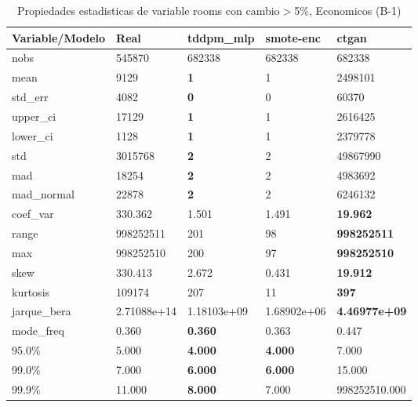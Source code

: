 \begin{table}[H]
\centering
\fontsize{8}{14}\selectfont
\caption{Propiedades estadisticas de variable rooms con cambio\ensuremath{>}5\%, Economicos (B-1)}
\label{table-stats-economicos-b-1-rooms-short}
\begin{tabular}{|l|m{10em}|m{10em}|m{10em}|m{10em}|}
\hline
 \rowcolor[gray]{0.8}
Variable/Modelo & Real & tddpm\_mlp & smote-enc & ctgan \\
\hline nobs & 545870 & 682338 & 682338 & 682338 \\
\hline mean & 9129 & \bfseries 1 & 1 & \cellcolor[rgb]{0.9, 0.54, 0.52} 2498101 \\
\hline std\_err & 4082 & \bfseries 0 & 0 & \cellcolor[rgb]{0.9, 0.54, 0.52} 60370 \\
\hline upper\_ci & 17129 & \bfseries 1 & 1 & \cellcolor[rgb]{0.9, 0.54, 0.52} 2616425 \\
\hline lower\_ci & 1128 & \bfseries 1 & 1 & \cellcolor[rgb]{0.9, 0.54, 0.52} 2379778 \\
\hline std & 3015768 & \bfseries 2 & 2 & \cellcolor[rgb]{0.9, 0.54, 0.52} 49867990 \\
\hline mad & 18254 & \bfseries 2 & 2 & \cellcolor[rgb]{0.9, 0.54, 0.52} 4983692 \\
\hline mad\_normal & 22878 & \bfseries 2 & 2 & \cellcolor[rgb]{0.9, 0.54, 0.52} 6246132 \\
\hline coef\_var & 330.362 & 1.501 & \cellcolor[rgb]{0.9, 0.54, 0.52} 1.491 & \bfseries 19.962 \\
\hline range & 998252511 & 201 & \cellcolor[rgb]{0.9, 0.54, 0.52} 98 & \bfseries 998252511 \\
\hline max & 998252510 & 200 & \cellcolor[rgb]{0.9, 0.54, 0.52} 97 & \bfseries 998252510 \\
\hline skew & 330.413 & 2.672 & \cellcolor[rgb]{0.9, 0.54, 0.52} 0.431 & \bfseries 19.912 \\
\hline kurtosis & 109174 & 207 & \cellcolor[rgb]{0.9, 0.54, 0.52} 11 & \bfseries 397 \\
\hline jarque\_bera & 2.71088e+14 & 1.18103e+09 & \cellcolor[rgb]{0.9, 0.54, 0.52} 1.68902e+06 & \bfseries 4.46977e+09 \\
\hline mode\_freq & 0.360 & \bfseries 0.360 & 0.363 & \cellcolor[rgb]{0.9, 0.54, 0.52} 0.447 \\
\hline 95.0\% & 5.000 & \bfseries 4.000 & \bfseries 4.000 & \cellcolor[rgb]{0.9, 0.54, 0.52} 7.000 \\
\hline 99.0\% & 7.000 & \bfseries 6.000 & \bfseries 6.000 & \cellcolor[rgb]{0.9, 0.54, 0.52} 15.000 \\
\hline 99.9\% & 11.000 & \bfseries 8.000 & 7.000 & \cellcolor[rgb]{0.9, 0.54, 0.52} 998252510.000 \\
\hline
\end{tabular}
\end{table}
